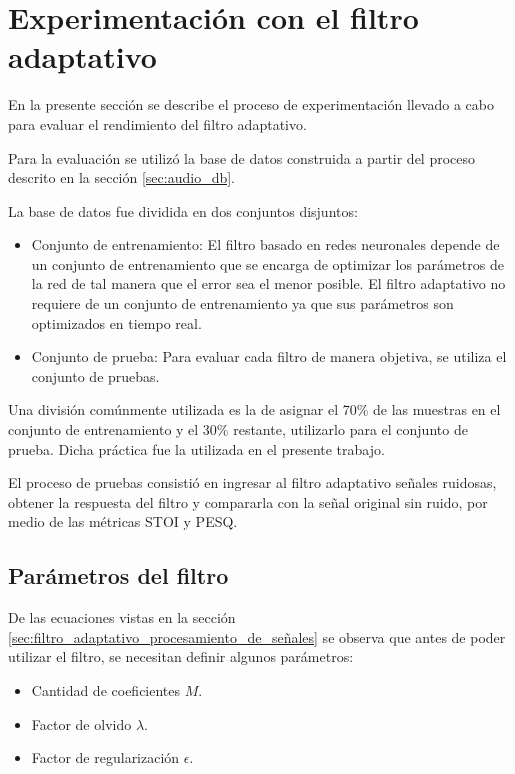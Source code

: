 \section{Experimentación con el filtro adaptativo}

En la presente sección se describe el proceso de experimentación llevado a cabo para evaluar el rendimiento del filtro adaptativo.

Para la evaluación se utilizó la base de datos construida a partir del proceso descrito en la sección \ref{sec:audio_db}.

La base de datos fue dividida en dos conjuntos disjuntos:

\begin{itemize}
	\item Conjunto de entrenamiento: El filtro basado en redes neuronales depende de un conjunto de entrenamiento que se encarga de optimizar los parámetros de la red de tal manera que el error sea el menor posible. El filtro adaptativo no requiere de un conjunto de entrenamiento ya que sus parámetros son optimizados en tiempo real.
	\item Conjunto de prueba: Para evaluar cada filtro de manera objetiva, se utiliza el conjunto de pruebas.
\end{itemize}

Una división comúnmente utilizada es la de asignar el 70\% de las muestras en el conjunto de entrenamiento y el 30\% restante, utilizarlo para el conjunto de prueba. Dicha práctica fue la utilizada en el presente trabajo.

El proceso de pruebas consistió en ingresar al filtro adaptativo señales ruidosas, obtener la respuesta del filtro y compararla con la señal original sin ruido, por medio de las métricas STOI y PESQ.

\subsection{Parámetros del filtro}

De las ecuaciones vistas en la sección \ref{sec:filtro_adaptativo_procesamiento_de_señales} se observa que antes de poder utilizar el filtro, se necesitan definir algunos parámetros:

\begin{itemize}
	\item Cantidad de coeficientes $M$.
	\item Factor de olvido $\lambda$.
	\item Factor de regularización $\epsilon$.
\end{itemize}


